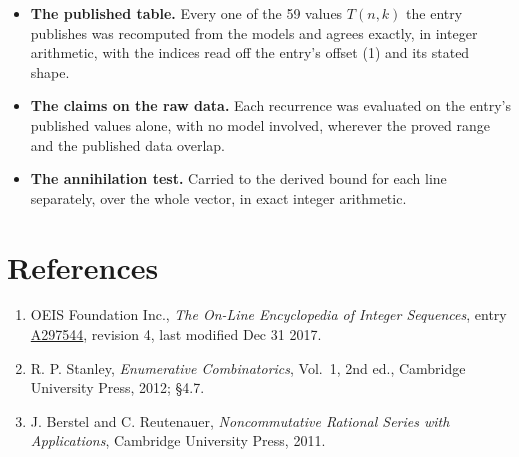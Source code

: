 \documentclass[11pt]{article}
\theoremstyle{definition}
\begin{document}
\begin{itemize}

\item {\bfseries The published table.} Every one of the 59 values $T(n,k)$ the entry publishes was recomputed from the models and agrees exactly, in integer arithmetic, with the indices read off the entry's offset (1) and its stated shape.

\item {\bfseries The claims on the raw data.} Each recurrence was evaluated on the entry's published values alone, with no model involved, wherever the proved range and the published data overlap.

\item {\bfseries The annihilation test.} Carried to the derived bound for each line separately, over the whole vector, in exact integer arithmetic.

\end{itemize}

\section{References}

\begin{enumerate}

\item OEIS Foundation Inc., \emph{The On-Line Encyclopedia of Integer Sequences}, entry \href{https://oeis.org/A297544}{A297544}, revision 4, last modified Dec 31 2017.

\item R. P. Stanley, \emph{Enumerative Combinatorics}, Vol.~1, 2nd ed., Cambridge University Press, 2012; \S4.7.

\item J. Berstel and C. Reutenauer, \emph{Noncommutative Rational Series with Applications}, Cambridge University Press, 2011.

\end{enumerate}
\end{document}

